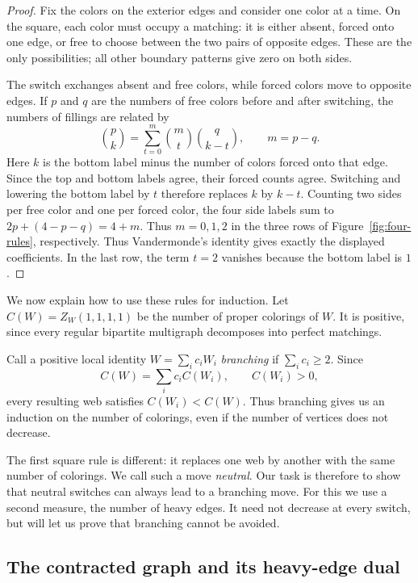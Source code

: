 \documentclass[11pt]{article}
\theoremstyle{definition}
\theoremstyle{remark}
\begin{document}
\begin{proof}
Fix the colors on the exterior edges and consider
one color at a time. On the square, each color
must occupy a matching: it is either absent,
forced onto one edge, or free to choose between
the two pairs of opposite edges. These are the
only possibilities; all other boundary patterns
give zero on both sides.

The switch exchanges absent and free colors,
while forced colors move to opposite edges.
If $p$ and $q$ are the numbers of free colors
before and after switching, the numbers of
fillings are related by
\[
\binom pk=\sum_{t=0}^m\binom mt\binom q{k-t},
\qquad m=p-q.
\]
Here $k$ is the bottom label minus the number of colors
forced onto that edge. Since the top and bottom labels
agree, their forced counts agree. Switching and lowering
the bottom label by $t$ therefore replaces $k$ by $k-t$.
Counting two sides per free color and one per forced color,
the four side labels sum to $2p+(4-p-q)=4+m$. Thus
$m=0,1,2$ in the three rows of Figure~\ref{fig:four-rules},
respectively. Thus
Vandermonde's identity gives exactly the displayed
coefficients. In the last row, the term $t=2$
vanishes because the bottom label is $1$.
\end{proof}


We now explain how to use these rules for induction.
Let $C(W)=Z_W(1,1,1,1)$ be the number of
proper colorings of $W$. It is positive,
since every regular bipartite multigraph
decomposes into perfect matchings.


Call a positive local identity
$W=\sum_i c_iW_i$ \emph{branching} if
$\sum_i c_i\ge2$. Since
\[
C(W)=\sum_i c_iC(W_i),
\qquad C(W_i)>0,
\]
every resulting web satisfies $C(W_i)<C(W)$.
Thus branching gives us an induction on the
number of colorings, even if the number of
vertices does not decrease.

The first square rule is different: it replaces
one web by another with the same number of
colorings. We call such a move \emph{neutral}.
Our task is therefore to show that neutral
switches can always lead to a branching move.
For this we use a second measure, the number
of heavy edges. It need not decrease at every
switch, but will let us prove that branching
cannot be avoided.



\subsection{The contracted graph and its heavy-edge dual}
\end{document}
